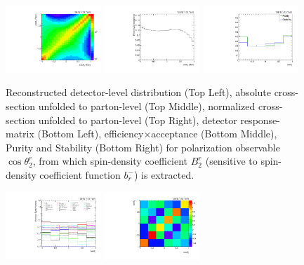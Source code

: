 \begin{refsection}
\begin{figure}[htb]
\begin{center}
 \includegraphics[width=0.32\textwidth]{fig_fullRun2UL/unfolding/combined/ResponseMatrix_b2r.pdf}
 \includegraphics[width=0.32\textwidth]{fig_fullRun2UL/unfolding/combined/TotEff_b2r.pdf}
 \includegraphics[width=0.32\textwidth]{fig_fullRun2UL/unfolding/combined/PurStab_b2r.pdf} \\
\caption{Reconstructed detector-level distribution (Top Left), absolute cross-section unfolded to parton-level (Top Middle), normalized cross-section unfolded to parton-level (Top Right), detector response-matrix (Bottom Left), efficiency$\times$acceptance (Bottom Middle), Purity and Stability (Bottom Right) for polarization observable $\cos\theta_{2}^{r}$, from which spin-density coefficient $B_{2}^{r}$ (sensitive to spin-density coefficient function $b_r^{-}$) is extracted.}
\label{fig:b2r}
\end{center}
\end{figure}
\clearpage
\begin{figure}[htb]
\begin{center}
 \includegraphics[width=0.32\textwidth]{fig_fullRun2UL/unfolding/combined/deltaSystCombinedlog_rebinnedB_b2r.pdf}
 \includegraphics[width=0.32\textwidth]{fig_fullRun2UL/unfolding/combined/StatCovMatrix_rebinnedB_b2r.pdf}

\end{center}
\end{figure}
\end{refsection}

